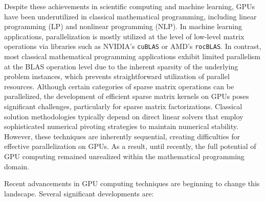 \documentclass[smallextended]{svjour3}
\begin{document}
Despite these achievements in scientific computing and machine learning, GPUs have been underutilized in classical mathematical programming, including linear programming (LP) and nonlinear programming (NLP). In machine learning applications, parallelization is mostly utilized at the level of low-level matrix operations via libraries such as NVIDIA's {\tt cuBLAS} or AMD's {\tt rocBLAS}. In contrast, most classical mathematical programming applications exhibit limited parallelism at the BLAS operation level due to the inherent sparsity of the underlying problem instances, which prevents straightforward utilization of parallel resources. Although certain categories of sparse matrix operations can be parallelized, the development of efficient sparse matrix kernels on GPUs poses significant challenges, particularly for sparse matrix factorizations. Classical solution methodologies typically depend on direct linear solvers that employ sophisticated numerical pivoting strategies to maintain numerical stability. However, these techniques are inherently sequential, creating difficulties for effective parallelization on GPUs. As a result, until recently, the full potential of GPU computing remained unrealized within the mathematical programming domain.

Recent advancements in GPU computing techniques are beginning to change this landscape. Several significant developments are:
\end{document}
